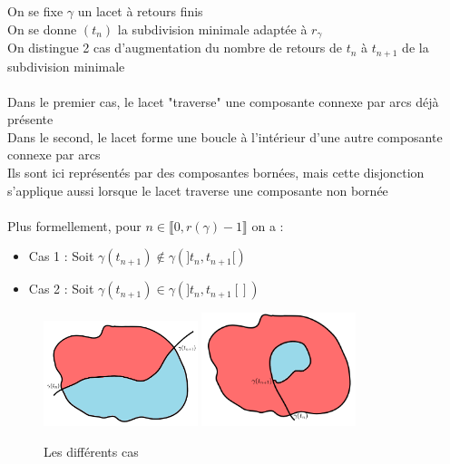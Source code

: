 \documentclass{article}
\begin{document}
\begin{flushleft}
On se fixe $\gamma$ un lacet à retours finis\\
On se donne $(t_n)$ la subdivision minimale adaptée à $r_{\gamma}$\\
On distingue 2 cas d'augmentation du nombre de retours de $t_n$ à $t_{n+1}$ de la subdivision minimale
\\~\\

Dans le premier cas, le lacet "traverse" une composante connexe par arcs déjà présente\\
Dans le second, le lacet forme une boucle à l'intérieur d'une autre composante connexe par arcs\\
Ils sont ici représentés par des composantes bornées, mais cette disjonction s'applique aussi lorsque le lacet traverse une composante
non bornée
\\~\\
Plus formellement, pour $n \in \llbracket 0, r(\gamma) -1 \rrbracket$ on a :
\begin{itemize}
    \item Cas 1 : Soit $\gamma(t_{n+1}) \notin \gamma(]t_n, t_{n+1}[)$\\
    \item Cas 2 : Soit $\gamma(t_{n+1}) \in \gamma(]t_n, t_{n+1}[])$
\end{itemize}

\begin{figure}[h]
    \caption{Les différents cas}
    \centering
    \includegraphics*[width=0.4\textwidth]{Cas 1.png}
    \includegraphics*[width=0.4\textwidth]{Cas 2.png}
\end{figure}

\vspace*{3cm}


\end{flushleft}
\end{document}
